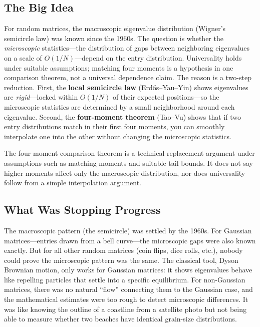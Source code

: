 \subsection{The Big Idea}
For random matrices, the macroscopic eigenvalue distribution (Wigner's semicircle law) was known since the 1960s. The question is whether the \emph{microscopic} statistics---the distribution of gaps between neighboring eigenvalues on a scale of $O(1/N)$---depend on the entry distribution. Universality holds under suitable assumptions; matching four moments is a hypothesis in one comparison theorem, not a universal dependence claim. The reason is a two-step reduction. First, the \textbf{local semicircle law} (Erd\H{o}s--Yau--Yin) shows eigenvalues are \emph{rigid}---locked within $O(1/N)$ of their expected positions---so the microscopic statistics are determined by a small neighborhood around each eigenvalue. Second, the \textbf{four-moment theorem} (Tao--Vu) shows that if two entry distributions match in their first four moments, you can smoothly interpolate one into the other without changing the microscopic statistics.

The four-moment comparison theorem is a technical replacement argument under assumptions such as matching moments and suitable tail bounds. It does not say higher moments affect only the macroscopic distribution, nor does universality follow from a simple interpolation argument.

\subsection{What Was Stopping Progress}
The macroscopic pattern (the semicircle) was settled by the 1960s. For Gaussian matrices---entries drawn from a bell curve---the microscopic gaps were also known exactly. But for all other random matrices (coin flips, dice rolls, etc.), nobody could prove the microscopic pattern was the same. The classical tool, Dyson Brownian motion, only works for Gaussian matrices: it shows eigenvalues behave like repelling particles that settle into a specific equilibrium. For non-Gaussian matrices, there was no natural ``flow'' connecting them to the Gaussian case, and the mathematical estimates were too rough to detect microscopic differences. It was like knowing the outline of a coastline from a satellite photo but not being able to measure whether two beaches have identical grain-size distributions.

